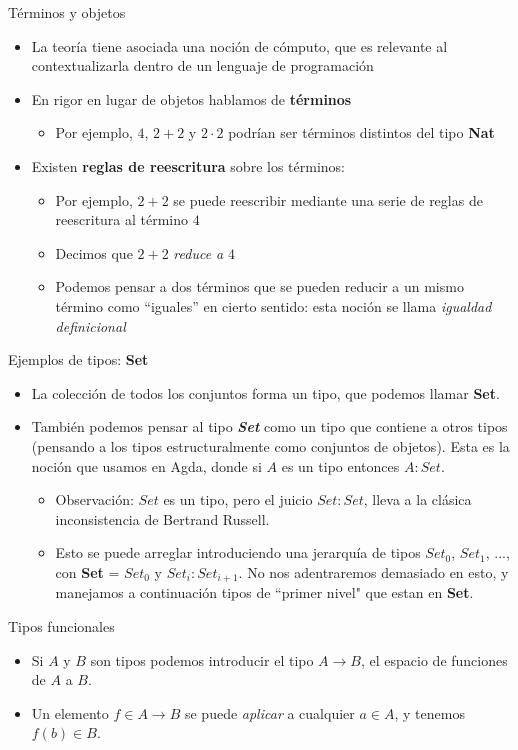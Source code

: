 \documentclass[11pt]{beamer}
\newcommand{\bit}{\begin{itemize}\setlength\itemsep{1em}}
\newcommand{\biti}{\begin{itemize}\setlength\itemsep{0.3em}}
\newcommand{\eit}{\end{itemize}}
\begin{document}
\begin{frame}{Términos y objetos}
\bit
\item La teoría tiene asociada una noción de cómputo, que es relevante al contextualizarla dentro de un lenguaje de programación
\item En rigor en lugar de objetos hablamos de \textbf{términos}
\biti
\item Por ejemplo, $4$, $2 + 2$ y $2 \cdot 2$ podrían ser términos distintos del tipo \textbf{Nat}
\eit
\pause
\item Existen \textbf{reglas de reescritura} sobre los términos:
\biti
\item Por ejemplo, $2 + 2$ se puede reescribir mediante una serie de reglas de reescritura al término $4$
\item Decimos que $2 + 2$ \textit{reduce a} $4$
\item Podemos pensar a dos términos que se pueden reducir a un mismo término como ``iguales'' en cierto sentido: esta noción se llama \textit{igualdad definicional}
\eit
\eit
\end{frame}

\begin{frame}{Ejemplos de tipos: \textbf{Set}}
\bit
\item La colección de todos los conjuntos forma un tipo, que podemos llamar \textbf{Set}.
\item También podemos pensar al tipo \textit{\textbf{Set}} como un tipo que contiene a otros tipos (pensando a los tipos estructuralmente como conjuntos de objetos). Esta es la noción que usamos en Agda, donde si $A$ es un tipo entonces $A : Set$.
\pause
\biti
\item Observación: $Set$ es un tipo, pero el juicio $Set : Set$, lleva a la clásica inconsistencia de Bertrand Russell.
\item Esto se puede arreglar introduciendo una jerarquía de tipos $Set_0$, $Set_1$, $...$, con \textbf{Set} = $Set_0$ y $Set_{i} : Set_{i+1}$. No nos adentraremos demasiado en esto, y manejamos a continuación tipos de ``primer nivel" que estan en \textbf{Set}.
\eit
\eit
\end{frame}

\begin{frame}{Tipos funcionales}
\bit
\item Si $A$ y $B$ son tipos podemos introducir el tipo $A \rightarrow B$, el espacio de funciones de $A$ a $B$.
\item Un elemento $f \in A \rightarrow B$ se puede \textit{aplicar} a cualquier $a \in A$, y tenemos $f(b) \in B$.
\eit
\end{frame}
\end{document}

